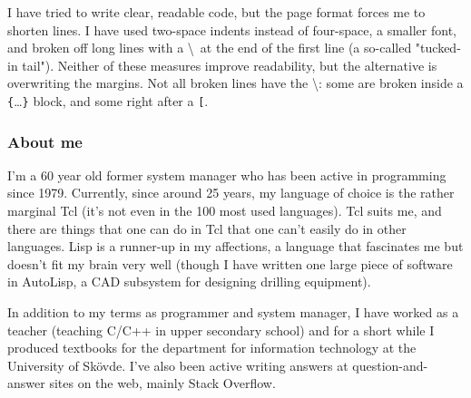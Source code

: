 \documentclass[twoside,9pt]{report}
\begin{document}
I have tried to write clear, readable code, but the page format forces me to
shorten lines. I have used two-space indents instead of four-space, a smaller
font, and broken off long lines with a \textbackslash\  at the end of the first
line (a so-called "tucked-in tail"). Neither of these measures improve
readability, but the alternative is overwriting the margins. Not all broken
lines have the \textbackslash: some are broken inside a
\texttt{\{}\ldots\texttt{\}} block, and some right after a \texttt{[}.

\subsubsection{About me}
\label{about-me}

I'm a 60 year old former system manager who has been active in programming
since 1979. Currently, since around 25 years, my language of choice is the
rather marginal Tcl (it's not even in the 100 most used languages). Tcl suits
me, and there are things that one can do in Tcl that one can't easily do in
other languages. Lisp is a runner-up in my affections, a language that
fascinates me but doesn't fit my brain very well (though I have written one
large piece of software in AutoLisp, a CAD subsystem for designing drilling
equipment).

In addition to my terms as programmer and system manager, I have worked as a
teacher (teaching C/C++ in upper secondary school) and for a short while I
produced textbooks for the department for information technology at
the University of Skövde. I've also been active writing answers at
question-and-answer sites on the web, mainly Stack Overflow.
\end{document}
